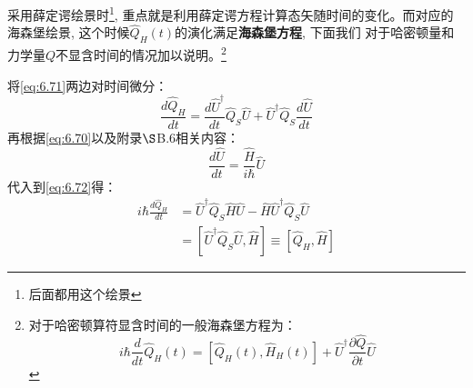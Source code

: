 采用薛定谔绘景时\footnote{后面都用这个绘景}, 重点就是利用薛定谔方程计算态矢随时间的变化。而对应的海森堡绘景, 这个时候$\hat{Q}_H(t)$的演化满足\textbf{海森堡方程}, 下面我们
对于哈密顿量和力学量$Q$不显含时间的情况加以说明。\footnote{对于哈密顿算符显含时间的一般海森堡方程为：\[i \hbar \frac{d}{d t} \hat{Q}_{H}(t)=\left[\hat{Q}_{H}(t), \hat{H}_{H}(t)\right]+\hat{U}^{\dagger} \frac{\partial \hat{Q}}{\partial t} \hat{U}\]}

将\ref{eq:6.71}两边对时间微分：
\begin{equation}
    \label{eq:6.72}
    \frac{d\hat{Q}_H}{dt}=\frac{d\hat{U}^\dagger}{dt}\hat{Q}_S\hat{U}+\hat{U}^\dagger\hat{Q}_S\frac{d\hat{U}}{dt}
\end{equation}
再根据\ref{eq:6.70}以及附录$\S$B.6相关内容：
\begin{equation}
    \frac{d\hat{U}}{dt}=\frac{\hat{H}}{i\hbar}\hat{U}
\end{equation}
代入到\ref{eq:6.72}得：
\begin{align*}
    i\hbar\frac{d\hat{Q}_H}{dt}&=\hat{U}^\dagger\hat{Q}_S\hat{H}\hat{U}-\hat{H}\hat{U}^\dagger\hat{Q}_S\hat{U}\\
    &=\left[\hat{U}^\dagger\hat{Q}_S\hat{U},\hat{H}\right]\equiv\left[\hat{Q}_H,\hat{H}\right]
\end{align*}

